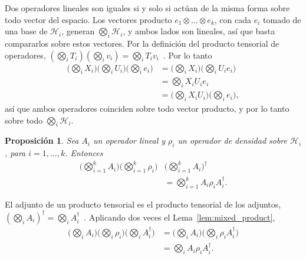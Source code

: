 \documentclass{ieeeaccess}
\newtheorem{proposition}{Proposición}[section]
\begin{document}
\begin{IEEEproof}
  Dos operadores lineales son iguales si y solo si actúan de la misma forma sobre todo vector del espacio. Los vectores producto $e_1 \otimes \dots \otimes e_k$, con cada $e_i$ tomado de una base de $\mathcal{H}_i$, generan $\bigotimes_{i} \mathcal{H}_i$, y ambos lados son lineales, así que basta compararlos sobre estos vectores. Por la definición del producto tensorial de operadores, $(\bigotimes_i T_i)(\bigotimes_i v_i) = \bigotimes_i T_i v_i$~\cite[Ec.~(1.8)]{zwiebach2013tensor}.
  Por lo tanto
  \begin{align*}
    \Big(\bigotimes_{i} X_i\Big)\Big(\bigotimes_{i} U_i\Big)\Big(\bigotimes_{i} e_i\Big)
      &= \Big(\bigotimes_{i} X_i\Big)\Big(\bigotimes_{i} U_i e_i\Big) \\
      &= \bigotimes_{i} X_i U_i e_i \\
      &= \Big(\bigotimes_{i} X_i U_i\Big)\Big(\bigotimes_{i} e_i\Big),
  \end{align*}
  así que ambos operadores coinciden sobre todo vector producto, y por lo tanto sobre todo $\bigotimes_i \mathcal{H}_i$.
\end{IEEEproof}

\begin{proposition}
  Sea $A_i$ un operador lineal y $\rho_i$ un operador de densidad sobre $\mathcal{H}_i$, para $i = 1, \dots, k$. Entonces
  \begin{align*}
    \Big(\bigotimes_{i=1}^{k} A_i\Big)\Big(\bigotimes_{i=1}^{k} \rho_i\Big)&\Big(\bigotimes_{i=1}^{k} A_i\Big)^{\dagger} \\
      &= \bigotimes_{i=1}^{k} A_i \rho_i A_i^{\dagger}.
  \end{align*}
  \label{prop:product_operation}
\end{proposition}

\begin{IEEEproof}
  El adjunto de un producto tensorial es el producto tensorial de los adjuntos, $(\bigotimes_i A_i)^{\dagger} = \bigotimes_i A_i^{\dagger}$~\cite{Nielsen_Chuang_2010}.
  Aplicando dos veces el Lema~\ref{lem:mixed_product},
  \begin{align*}
    \Big(\bigotimes_{i} A_i\Big)\Big(\bigotimes_{i} \rho_i\Big)\Big(\bigotimes_{i} A_i^{\dagger}\Big)
      &= \Big(\bigotimes_{i} A_i\Big)\Big(\bigotimes_{i} \rho_i A_i^{\dagger}\Big) \\
      &= \bigotimes_{i} A_i \rho_i A_i^{\dagger}.
  \end{align*}
\end{IEEEproof}
\end{document}
